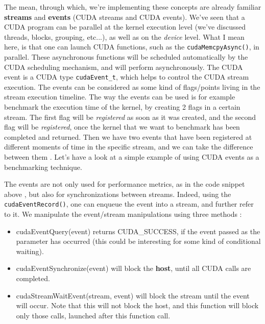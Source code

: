The mean, through which, we're implementing these concepts are already familiar \textbf{streams} and \textbf{events} (CUDA streams and CUDA events).
We've seen that a CUDA program can be parallel at the kernel execution level (we've discussed threads, blocks, grouping, etc...), as well as on 
the \textit{device} level. What I mean here, is that one can launch CUDA functions, such as the \verb|cudaMemcpyAsync()|, in parallel. These asynchronous 
functions will be scheduled automatically by the CUDA scheduling mechanism, and will perform asynchronously.
The CUDA event is a CUDA type \verb|cudaEvent_t|, which helps to control the CUDA stream execution.
The events can be considered as some kind of flags/points living in the stream execution timeline. 
The way the events can be used is for example benchmark the execution time of the kernel, by creating 2 flags in a certain stream. 
The first flag will be \textit{registered} as soon as it was created, and the second flag will be \textit{registered}, once the 
kernel that we want to benchmark has been completed and returned. Then we have two events that have been registered at different 
moments of time in the specific stream, and we can take the difference between them \cite{cuda_events}.
Let's have a look at a simple example of using CUDA events as a benchmarking technique.

The events are not only used for performance metrics, as in the code snippet above \cite{cuda_performance_metrics}, but also for synchronizations between streams.
Indeed, using the \verb|cudaEventRecord()|, one can enqueue the event into a stream, and further refer to it. 
We manipulate the event/stream manipulations using three methods \cite{streams_best_practices}:
\begin{itemize}
  \item {\selectfont cudaEventQuery(event)} returns {\selectfont CUDA\_SUCCESS}, if the event passed as the parameter has occurred (this could be interesting for some kind of conditional waiting).
  \item {\selectfont cudaEventSynchronize(event)} will block the \textbf{host}, until all CUDA calls are completed.
  \item {\selectfont cudaStreamWaitEvent(stream, event)} will block the stream until the event will occur. Note that this will not block the host, and this function will block only those calls, launched after this function call.
\end{itemize}


